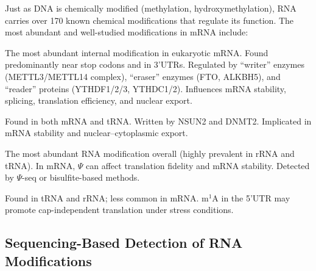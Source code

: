 Just as DNA is chemically modified (methylation, hydroxymethylation), RNA carries over 170 known chemical modifications that regulate its function. The most abundant and well-studied modifications in mRNA include:

\begin{description}[style=nextline, itemsep=3pt]
  \item[N$^6$-methyladenosine (m$^6$A)] The most abundant internal modification in eukaryotic mRNA. Found predominantly near stop codons and in 3'UTRs. Regulated by ``writer'' enzymes (METTL3/METTL14 complex), ``eraser'' enzymes (FTO, ALKBH5), and ``reader'' proteins (YTHDF1/2/3, YTHDC1/2). Influences mRNA stability, splicing, translation efficiency, and nuclear export.

  \item[5-methylcytosine (m$^5$C)] Found in both mRNA and tRNA. Written by NSUN2 and DNMT2. Implicated in mRNA stability and nuclear--cytoplasmic export.

  \item[Pseudouridine ($\Psi$)] The most abundant RNA modification overall (highly prevalent in rRNA and tRNA). In mRNA, $\Psi$ can affect translation fidelity and mRNA stability. Detected by $\Psi$-seq or bisulfite-based methods.

  \item[N$^1$-methyladenosine (m$^1$A)] Found in tRNA and rRNA; less common in mRNA. m$^1$A in the 5'UTR may promote cap-independent translation under stress conditions.
\end{description}

\subsection{Sequencing-Based Detection of RNA Modifications}
\label{subsec:specialized:rna-mod-detection}

